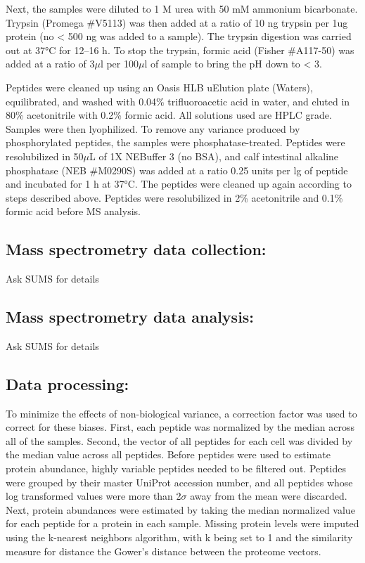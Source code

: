 \documentclass[11pt,]{article}
\begin{document}
Next, the samples were diluted to 1 M urea with 50 mM ammonium
bicarbonate. Trypsin (Promega \#V5113) was then added at a ratio of 10
ng trypsin per 1ug protein (no \textless{} 500 ng was added to a
sample). The trypsin digestion was carried out at 37°C for 12--16 h. To
stop the trypsin, formic acid (Fisher \#A117-50) was added at a ratio of
3\(\mu\)l per 100\(\mu\)l of sample to bring the pH down to \textless{}
3.

Peptides were cleaned up using an Oasis HLB uElution plate (Waters),
equilibrated, and washed with 0.04\% trifluoroacetic acid in water, and
eluted in 80\% acetonitrile with 0.2\% formic acid. All solutions used
are HPLC grade. Samples were then lyophilized. To remove any variance
produced by phosphorylated peptides, the samples were
phosphatase-treated. Peptides were resolubilized in 50\(\mu\)L of 1X
NEBuffer 3 (no BSA), and calf intestinal alkaline phosphatase (NEB
\#M0290S) was added at a ratio 0.25 units per lg of peptide and
incubated for 1 h at 37°C. The peptides were cleaned up again according
to steps described above. Peptides were resolubilized in 2\%
acetonitrile and 0.1\% formic acid before MS analysis.

\hypertarget{mass-spectrometry-data-collection}{%
\subsection{Mass spectrometry data
collection:}\label{mass-spectrometry-data-collection}}

Ask SUMS for details

\hypertarget{mass-spectrometry-data-analysis}{%
\subsection{Mass spectrometry data
analysis:}\label{mass-spectrometry-data-analysis}}

Ask SUMS for details

\hypertarget{data-processing}{%
\subsection{Data processing:}\label{data-processing}}

To minimize the effects of non-biological variance, a correction factor
was used to correct for these biases. First, each peptide was normalized
by the median across all of the samples. Second, the vector of all
peptides for each cell was divided by the median value across all
peptides. Before peptides were used to estimate protein abundance,
highly variable peptides needed to be filtered out. Peptides were
grouped by their master UniProt accession number, and all peptides whose
log transformed values were more than 2\(\sigma\) away from the mean
were discarded. Next, protein abundances were estimated by taking the
median normalized value for each peptide for a protein in each sample.
Missing protein levels were imputed using the k-nearest neighbors
algorithm, with k being set to 1 and the similarity measure for distance
the Gower's distance between the proteome vectors.
\end{document}
